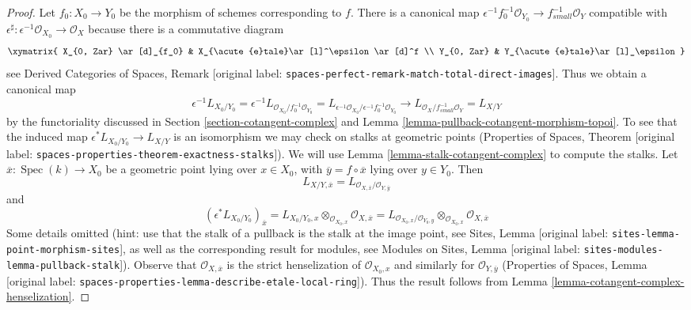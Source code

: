\documentclass[10pt,a4paper]{article}
\theoremstyle{plain}
\theoremstyle{definition}
\theoremstyle{remark}
\numberwithin{equation}{subsection}
\def\Spec{\mathop{\mathrm{Spec}}}
\def\etale{{\acute{e}tale}}
\begin{document}
\begin{proof}
Let $f_0 : X_0 \to Y_0$ be the morphism of schemes corresponding to $f$.
There is a canonical map
$\epsilon^{-1}f_0^{-1}\mathcal{O}_{Y_0} \to f_{small}^{-1}\mathcal{O}_Y$
compatible with
$\epsilon^\sharp : \epsilon^{-1}\mathcal{O}_{X_0} \to \mathcal{O}_X$
because there is a commutative diagram
$$
\xymatrix{
X_{0, Zar} \ar[d]_{f_0} & X_\etale \ar[l]^\epsilon \ar[d]^f \\
Y_{0, Zar} & Y_\etale \ar[l]_\epsilon
}
$$
see Derived Categories of Spaces, Remark
\textnormal{[original label: \nolinkurl{spaces-perfect-remark-match-total-direct-images}]}.
Thus we obtain a canonical map
$$
\epsilon^{-1}L_{X_0/Y_0} =
\epsilon^{-1}L_{\mathcal{O}_{X_0}/f_0^{-1}\mathcal{O}_{Y_0}} =
L_{\epsilon^{-1}\mathcal{O}_{X_0}/\epsilon^{-1}f_0^{-1}\mathcal{O}_{Y_0}}
\longrightarrow
L_{\mathcal{O}_X/f^{-1}_{small}\mathcal{O}_Y} = L_{X/Y}
$$
by the functoriality discussed in Section \ref{section-cotangent-complex}
and Lemma \ref{lemma-pullback-cotangent-morphism-topoi}.
To see that the induced map $\epsilon^*L_{X_0/Y_0} \to L_{X/Y}$ is an
isomorphism we may check on stalks at geometric points
(Properties of Spaces, Theorem
\textnormal{[original label: \nolinkurl{spaces-properties-theorem-exactness-stalks}]}).
We will use Lemma \ref{lemma-stalk-cotangent-complex}
to compute the stalks. Let $\overline{x} : \Spec(k) \to X_0$
be a geometric point lying over $x \in X_0$, with
$\overline{y} = f \circ \overline{x}$ lying over $y \in Y_0$. Then
$$
L_{X/Y, \overline{x}} =
L_{\mathcal{O}_{X, \overline{x}}/\mathcal{O}_{Y, \overline{y}}}
$$
and
$$
(\epsilon^*L_{X_0/Y_0})_{\overline{x}} =
L_{X_0/Y_0, x} \otimes_{\mathcal{O}_{X_0, x}}
\mathcal{O}_{X, \overline{x}} =
L_{\mathcal{O}_{X_0, x}/\mathcal{O}_{Y_0, y}}
\otimes_{\mathcal{O}_{X_0, x}} \mathcal{O}_{X, \overline{x}}
$$
Some details omitted (hint: use that the stalk of a pullback
is the stalk at the image point, see
Sites, Lemma \textnormal{[original label: \nolinkurl{sites-lemma-point-morphism-sites}]},
as well as the corresponding result for modules, see
Modules on Sites, Lemma \textnormal{[original label: \nolinkurl{sites-modules-lemma-pullback-stalk}]}).
Observe that $\mathcal{O}_{X, \overline{x}}$ is the strict
henselization of $\mathcal{O}_{X_0, x}$ and similarly
for $\mathcal{O}_{Y, \overline{y}}$
(Properties of Spaces, Lemma
\textnormal{[original label: \nolinkurl{spaces-properties-lemma-describe-etale-local-ring}]}).
Thus the result follows from
Lemma \ref{lemma-cotangent-complex-henselization}.
\end{proof}
\end{document}
